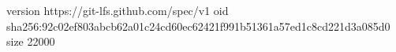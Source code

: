 version https://git-lfs.github.com/spec/v1
oid sha256:92c02ef803abcb62a01c24cd60ec62421f991b51361a57ed1c8cd221d3a085d0
size 22000
